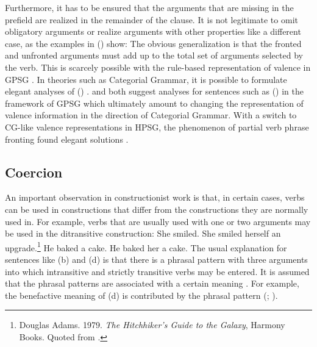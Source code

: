\documentclass[output=paper
	        ,collection
	        ,collectionchapter
 	        ,biblatex
                ,babelshorthands
                ,newtxmath
                ,draftmode
                ,colorlinks, citecolor=brown
]{langscibook}
\begin{document}
Furthermore, it has to be ensured that the arguments that are
missing in the prefield are realized in the remainder of the clause. It is not legitimate to omit
obligatory arguments or realize arguments with other properties like a different case, as the
examples in () show:
\eal
{}
\zl
The obvious generalization is that the fronted and unfronted arguments must add up to the total
set of arguments selected by the verb. This is scarcely possible with the rule-based
representation of valence in GPSG \citep{Nerbonne86a,Johnson86a}. In theories such as Categorial
Grammar, it is possible to formulate elegant analyses of () 
\citep{Geach70a}. \citet{Nerbonne86a} and \citet{Johnson86a} both suggest analyses for sentences
such as () in the framework of GPSG which
ultimately amount to changing the representation of valence information in the direction of
Categorial Grammar.
With a switch to CG-like valence representations in HPSG, the phenomenon of partial verb phrase
fronting found elegant solutions \parencites[Section~4]{HoehleSpuren}{Mueller96a}{Meurers99a}.


\subsection{Coercion}
\label{sec-coercion}

An important observation in constructionist work is that, in certain cases, verbs can be used in
constructions that differ from the constructions they are normally used in. For example, verbs that are usually
used with one or two arguments may be used in the ditransitive construction:
\eal
\ex She smiled.
\ex She smiled herself an upgrade.\footnote{
Douglas Adams. 1979. \emph{The Hitchhiker’s Guide to the Galaxy}, Harmony Books. Quoted from
\citet[]{Goldberg2003b}.
}
\ex He baked a cake.
\ex He baked her a cake.
\zl
The usual explanation for sentences like (b) and (d) is that there is a phrasal
pattern with three arguments into which intransitive and strictly transitive verbs may be
entered. It is assumed that the phrasal patterns are associated with a certain meaning \citep{Goldberg96a,GJ2004a}. For example,
the benefactive meaning of (d) is contributed by the phrasal pattern
(\citealt[Section~6]{Goldberg96a}; \citealt*[]{AGT2014a}).
\end{document}
